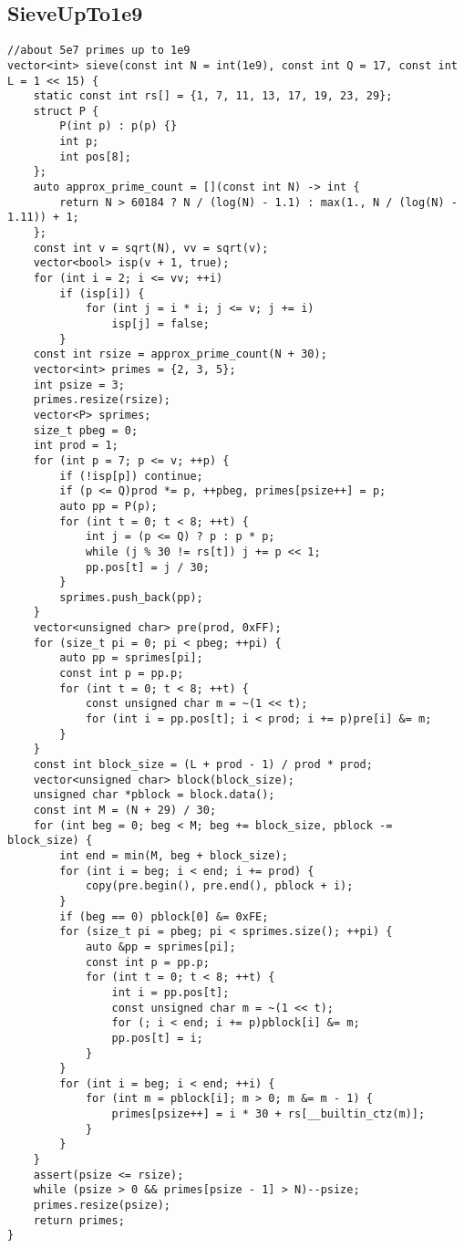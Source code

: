 \documentclass{article}
\begin{document}
\subsection{SieveUpTo1e9}
\begin{verbatim}
//about 5e7 primes up to 1e9
vector<int> sieve(const int N = int(1e9), const int Q = 17, const int L = 1 << 15) {
    static const int rs[] = {1, 7, 11, 13, 17, 19, 23, 29};
    struct P {
        P(int p) : p(p) {}
        int p;
        int pos[8];
    };
    auto approx_prime_count = [](const int N) -> int {
        return N > 60184 ? N / (log(N) - 1.1) : max(1., N / (log(N) - 1.11)) + 1;
    };
    const int v = sqrt(N), vv = sqrt(v);
    vector<bool> isp(v + 1, true);
    for (int i = 2; i <= vv; ++i)
        if (isp[i]) {
            for (int j = i * i; j <= v; j += i)
                isp[j] = false;
        }
    const int rsize = approx_prime_count(N + 30);
    vector<int> primes = {2, 3, 5};
    int psize = 3;
    primes.resize(rsize);
    vector<P> sprimes;
    size_t pbeg = 0;
    int prod = 1;
    for (int p = 7; p <= v; ++p) {
        if (!isp[p]) continue;
        if (p <= Q)prod *= p, ++pbeg, primes[psize++] = p;
        auto pp = P(p);
        for (int t = 0; t < 8; ++t) {
            int j = (p <= Q) ? p : p * p;
            while (j % 30 != rs[t]) j += p << 1;
            pp.pos[t] = j / 30;
        }
        sprimes.push_back(pp);
    }
    vector<unsigned char> pre(prod, 0xFF);
    for (size_t pi = 0; pi < pbeg; ++pi) {
        auto pp = sprimes[pi];
        const int p = pp.p;
        for (int t = 0; t < 8; ++t) {
            const unsigned char m = ~(1 << t);
            for (int i = pp.pos[t]; i < prod; i += p)pre[i] &= m;
        }
    }
    const int block_size = (L + prod - 1) / prod * prod;
    vector<unsigned char> block(block_size);
    unsigned char *pblock = block.data();
    const int M = (N + 29) / 30;
    for (int beg = 0; beg < M; beg += block_size, pblock -= block_size) {
        int end = min(M, beg + block_size);
        for (int i = beg; i < end; i += prod) {
            copy(pre.begin(), pre.end(), pblock + i);
        }
        if (beg == 0) pblock[0] &= 0xFE;
        for (size_t pi = pbeg; pi < sprimes.size(); ++pi) {
            auto &pp = sprimes[pi];
            const int p = pp.p;
            for (int t = 0; t < 8; ++t) {
                int i = pp.pos[t];
                const unsigned char m = ~(1 << t);
                for (; i < end; i += p)pblock[i] &= m;
                pp.pos[t] = i;
            }
        }
        for (int i = beg; i < end; ++i) {
            for (int m = pblock[i]; m > 0; m &= m - 1) {
                primes[psize++] = i * 30 + rs[__builtin_ctz(m)];
            }
        }
    }
    assert(psize <= rsize);
    while (psize > 0 && primes[psize - 1] > N)--psize;
    primes.resize(psize);
    return primes;
}
\end{verbatim}
\end{document}
